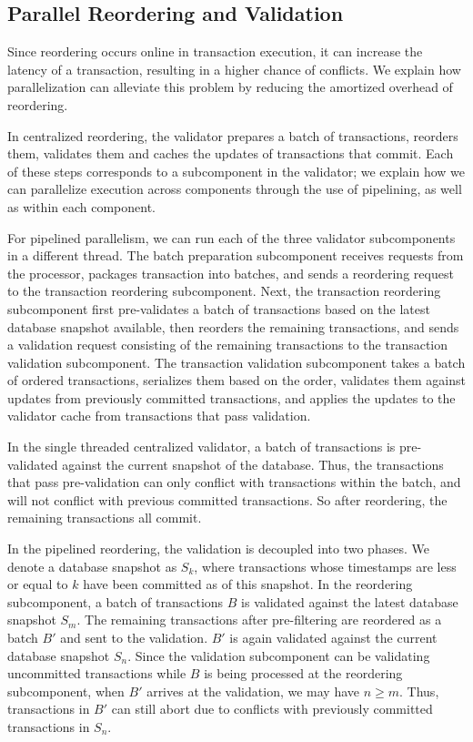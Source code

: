 \subsection{Parallel Reordering and Validation}
\label{subsec:validator_reordering:parallel}
Since reordering occurs online in transaction execution, it can increase the latency of a transaction, resulting in a higher chance of conflicts. We explain how parallelization can alleviate this problem by reducing the amortized overhead of reordering.

In centralized reordering, the validator prepares a batch of transactions, reorders them,  validates them and caches the updates of transactions that commit. Each of these steps corresponds to a subcomponent in the validator; we explain how we can parallelize execution across components through the use of pipelining, as well as within each component. 

For pipelined parallelism, we can run each of the three validator subcomponents in a different thread. The batch preparation subcomponent receives requests from the processor, packages transaction into batches, and sends a reordering request to the transaction reordering subcomponent. Next, the transaction reordering subcomponent first pre-validates a batch of transactions based on the latest database snapshot available, then reorders the remaining transactions, and sends a validation request consisting of the remaining transactions to the transaction validation subcomponent. 
The transaction validation subcomponent takes a batch of ordered
transactions, serializes them based on the order, validates them against updates from previously committed transactions, and applies the updates to the validator cache from transactions that pass validation. 

In the single threaded centralized validator, a batch of transactions is
pre-validated against the current snapshot of the database. Thus, the
transactions that pass pre-validation can only conflict with transactions within the batch, and will not conflict with previous committed transactions. So after reordering, the remaining transactions all commit.

In the pipelined reordering, the validation is decoupled into two phases. We denote a database snapshot as $S_k$, where transactions whose timestamps are less or equal to $k$ have been committed as of this snapshot. In the reordering subcomponent, a batch of transactions $B$ is validated against the latest database snapshot $S_m$. The remaining transactions after pre-filtering are reordered as a batch $B'$ and sent to the validation. $B'$ is again validated against the current database snapshot $S_n$. Since the validation subcomponent can be validating uncommitted transactions while $B$ is being processed at the reordering subcomponent, when $B'$ arrives at the validation,  we may have $n\geq m$. Thus, transactions in $B'$ can still abort due to conflicts with previously committed transactions in $S_n$.


